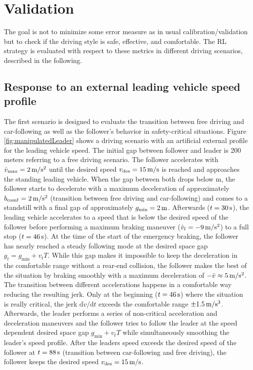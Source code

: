 \documentclass[review]{elsarticle}
\providecommand{\sub}[1]{_{\mathrm{#1}}}  %
\providecommand{\3}{{\ss}}
\begin{document}
	
	
	
	
	
	
	
	\section{Validation}
	\label{sec:validation}
	The goal is not to minimize some error measure as in usual calibration\slash validation but to check if the driving style is safe,
	effective, and comfortable. The RL strategy is evaluated with respect to these metrics in different driving scenarios, described in the following.
	
	\subsection{Response to an external leading vehicle speed profile}
	The first scenario is designed to evaluate the transition between free driving and car-following as well as the follower's behavior in safety-critical situations. 
	Figure \ref{fig:manipulatedLeader} shows a driving scenario with an
	artificial external profile for the leading vehicle speed. The initial
	gap between 
	follower and leader is 200 meters referring to a free driving
	scenario. The follower accelerates with $\dot{v}\sub{max} = \unit[2]{m/s^2}$ until
	the desired speed $v\sub{des} = \unit[15]{m/s} $ is reached and approaches
	the standing leading vehicle. When the gap between both drops below 
	\unit[70]{m},
	the follower starts to decelerate with a maximum
	deceleration of approximately $b_{\rm
		comf} = \unit[2]{m/s^2}$ (transition between free driving and car-following)
	and comes to a standstill with a final gap of approximately 
	$g\sub{min} = \unit[2]{m}$. Afterwards ($t=\unit[30]{s}$),  the leading vehicle accelerates to a speed
	that is below the desired speed of the follower before performing a
	maximum braking maneuver ($\dot{v}_l=\unit[-9]{m/s^2}$) to a full stop ($t=\unit[46]{s}$). At the time of the start of the
	emergency braking, the follower has nearly reached a steady
	following mode at the desired space gap $g_t=g\sub{min}+v_{t} T$. While this
	gap makes it impossible to keep the deceleration in the comfortable
	range without a rear-end collision, the follower makes the best of
	the situation by braking smoothly with a maximum deceleration of $-\dot{v}
	\approx \unit[5]{m/s^2}$.  The transition between different
	accelerations happens in a comfortable way reducing the resulting
	jerk. Only at the beginning ($t=\unit[46]{s}$) where the situation is
	really critical, the jerk $\text{d}\dot{v}/\text{d}t$ exceeds the comfortable range 
	$\pm \unit[1.5]{m/s^3}$. Afterwards, the leader performs a series of
	non-critical acceleration and deceleration maneuvers and the follower
	tries to follow the leader at the speed dependent desired space gap
	$g\sub{min}+v_{t}T$ while simultaneously smoothing the leader's speed profile. After the leaders speed exceeds the desired speed of the follower at $t=\unit[88]{s}$ (transition between car-following and free driving), the follower keeps the desired speed $v\sub{des} = \unit[15]{m/s} $.
	
\end{document}
